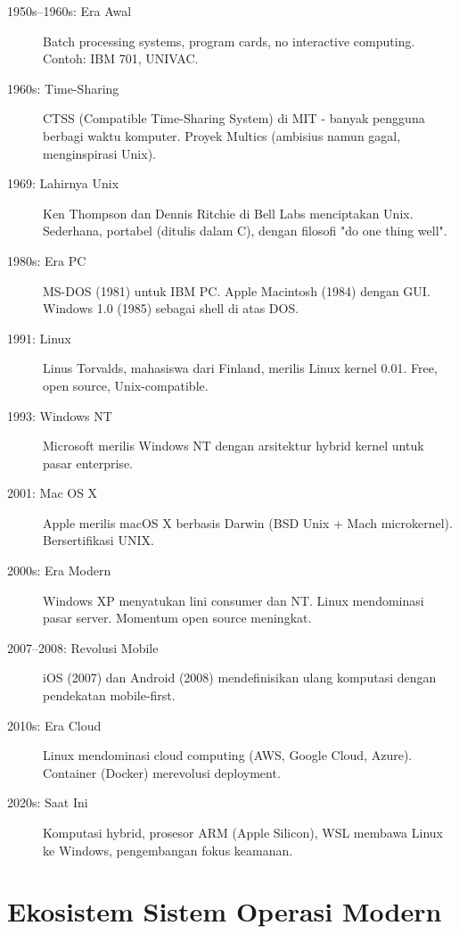 \begin{description}
    \item[1950s--1960s: Era Awal] Batch processing systems, program cards, no interactive computing. Contoh: IBM 701, UNIVAC.

    \item[1960s: Time-Sharing] CTSS (Compatible Time-Sharing System) di MIT - banyak pengguna berbagi waktu komputer. Proyek Multics (ambisius namun gagal, menginspirasi Unix).

    \item[1969: Lahirnya Unix] Ken Thompson dan Dennis Ritchie di Bell Labs menciptakan Unix. Sederhana, portabel (ditulis dalam C), dengan filosofi "do one thing well".

    \item[1980s: Era PC] MS-DOS (1981) untuk IBM PC. Apple Macintosh (1984) dengan GUI. Windows 1.0 (1985) sebagai shell di atas DOS.

    \item[1991: Linux] Linus Torvalds, mahasiswa dari Finland, merilis Linux kernel 0.01. Free, open source, Unix-compatible.

    \item[1993: Windows NT] Microsoft merilis Windows NT dengan arsitektur hybrid kernel untuk pasar enterprise.

    \item[2001: Mac OS X] Apple merilis macOS X berbasis Darwin (BSD Unix + Mach microkernel). Bersertifikasi UNIX.

    \item[2000s: Era Modern] Windows XP menyatukan lini consumer dan NT. Linux mendominasi pasar server. Momentum open source meningkat.

    \item[2007--2008: Revolusi Mobile] iOS (2007) dan Android (2008) mendefinisikan ulang komputasi dengan pendekatan mobile-first.

    \item[2010s: Era Cloud] Linux mendominasi cloud computing (AWS, Google Cloud, Azure). Container (Docker) merevolusi deployment.

    \item[2020s: Saat Ini] Komputasi hybrid, prosesor ARM (Apple Silicon), WSL membawa Linux ke Windows, pengembangan fokus keamanan.
\end{description}

\section{Ekosistem Sistem Operasi Modern}
\label{sec:os-ecosystem}

